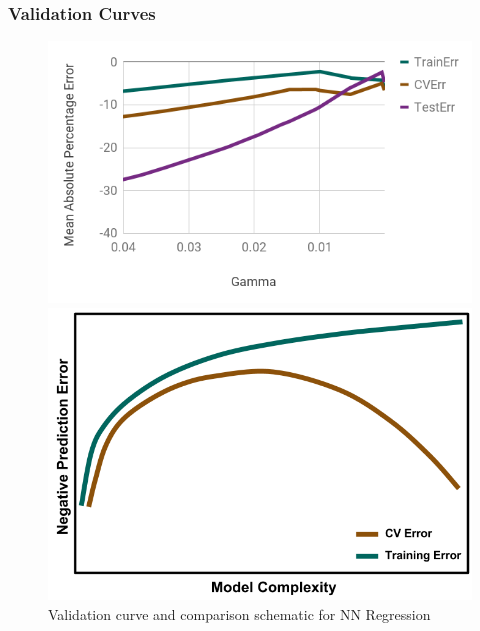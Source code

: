\begin{frame}
  \frametitle{Validation Curves}
  \begin{figure}
    \begin{minipage}{0.65\textwidth}
      \centering
      \includegraphics[width=\linewidth]{./figures/vc1.png}
    \end{minipage}%
    \begin{minipage}{0.4\textwidth}
      \centering
      \includegraphics[width=\linewidth]{./figures/NegValidCurve.png}
    \end{minipage}
    \caption{Validation curve and comparison schematic for NN Regression}
  \end{figure}
\end{frame}

